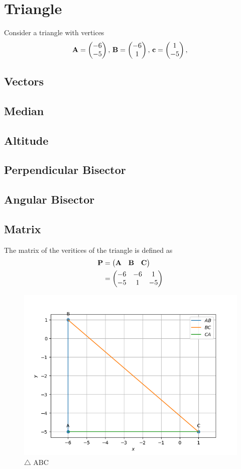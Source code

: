 \documentclass[11pt]{book}
\begin{document}
\frontmatter
\tableofcontents
\setcounter{page}{0}
\mainmatter
\chapter{Triangle}
Consider a triangle with vertices
\begin{align}
\label{eq:tri-pts}
\vec{A}=\myvec{-6 \\ -5},\,
\vec{B}=\myvec{-6\\1},\,
	\vec{c}=\myvec{1\\-5},\,
\end{align}

\section{Vectors}
\section{Median}
\section{Altitude}
\section{Perpendicular Bisector}
\section{Angular Bisector}
\section{Matrix}

The matrix of the veritices of the triangle is defined as
		\begin{align}
			\mathbf{P} &= \begin{pmatrix}\mathbf{A} & \mathbf{B} &\mathbf{C}\end{pmatrix} \\
            &=\begin{pmatrix}-6 & -6 & 1 \\ -5 & 1 & -5\end{pmatrix}
		\end{align}
\begin{figure}[H]
    \centering
    \includegraphics{figs/Triangle.png}
    \caption{$\triangle$ ABC}
    \label{fig:mat_vec1}
\end{figure}
\end{document}
